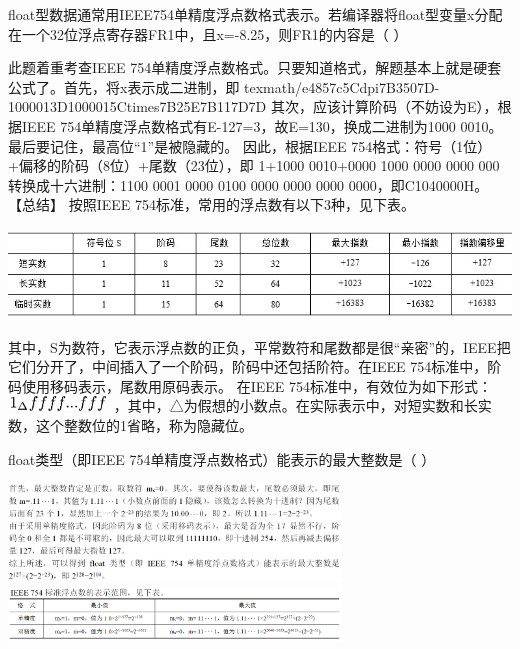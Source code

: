 \question float型数据通常用IEEE754单精度浮点数格式表示。若编译器将float型变量x分配在一个32位浮点寄存器FR1中，且x=-8.25，则FR1的内容是（
）
\par{}
\begin{solution}此题着重考查IEEE
754单精度浮点数格式。只要知道格式，解题基本上就是硬套公式了。首先，将x表示成二进制，即
{texmath/e4857c5Cdpi7B3507D-1000013D1000015Ctimes7B25E7B117D7D}
其次，应该计算阶码（不妨设为E），根据IEEE
754单精度浮点数格式有E-127=3，故E=130，换成二进制为1000
0010。最后要记住，最高位``1''是被隐藏的。 因此，根据IEEE
754格式：符号（1位）+偏移的阶码（8位）+尾数（23位），即 1+1000 0010+0000
1000 0000 0000 000 转换成十六进制：1100 0001 0000 0100 0000 0000 0000
0000，即C1040000H。 【总结】 按照IEEE
754标准，常用的浮点数有以下3种，见下表。
\includegraphics[width=7.38542in,height=1.22917in]{computerassets/c6f387b6aa95c2b1eb2a8d8c883630b3.jpeg}
其中，S为数符，它表示浮点数的正负，平常数符和尾数都是很``亲密''的，IEEE把它们分开了，中间插入了一个阶码，阶码中还包括阶符。在IEEE
754标准中，阶码使用移码表示，尾数用原码表示。 在IEEE
754标准中，有效位为如下形式：\includegraphics[width=1.05208in,height=0.15625in]{texmath/55398c5Cdpi7B3507D7B1_5CDelta7Dfffffff}
，其中，△为假想的小数点。在实际表示中，对短实数和长实数，这个整数位的1省略，称为隐藏位。
\end{solution}
\question float类型（即IEEE 754单精度浮点数格式）能表示的最大整数是（ ）
\par\fourch{}{}{}{\textcolor{red}{}}
\begin{solution}\includegraphics[width=3.46875in,height=1.02083in]{computerassets/19F28C8AD9B022A530A23C674E82250D.png}
\includegraphics[width=3.46875in,height=0.58333in]{computerassets/C1F89F0A001E6310DF6522CD75904A8A.png}
\end{solution}
